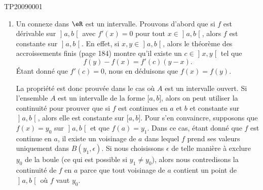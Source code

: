 
\begin{corrige}{TP20090001}

	\begin{enumerate}

		\item
			Un connexe dans $\eR$ est un intervalle. Prouvons d'abord que si $f$ est dérivable sur $\mathopen] a , b \mathclose[$ avec $f'(x)=0$ pour tout $x\in \mathopen] a , b \mathclose[$, alors $f$ est constante sur $\mathopen] a , b \mathclose[$. En effet, si $x,y\in\mathopen] a , b \mathclose[$, alors le théorème des accroissements finis (page 184) montre qu'il existe un $c\in\mathopen] x , y \mathclose[$ tel que
			\begin{equation}
				f(y)-f(x)=f'(c)(y-x).
			\end{equation}
			Étant donné que $f'(c)=0$, nous en déduisons que $f(x)=f(y)$.

			La propriété est donc prouvée dans le cas où $A$ est un intervalle ouvert. Si l'ensemble $A$ est un intervalle de la forme $\mathopen[ a , b \mathclose]$, alors on peut utiliser la continuité pour prouver que si $f$ est continues en $a$ et $b$ et constante sur $\mathopen] a , b \mathclose[$, alors elle est constante sur $\mathopen[ a , b \mathclose]$. Pour s'en convaincre, supposons que $f(x)=y_0$ sur $\mathopen] a , b \mathclose[$ et que $f(a)=y_1$. Dans ce cas, étant donné que $f$ est continue en $a$, il existe un voisinage de $a$ dans lequel $f$ prend ses valeurs uniquement dans $B(y_1,\epsilon)$. Si nous choisissons $\epsilon$ de telle manière à exclure $y_0$ de la boule (ce qui est possible si $y_1\neq y_0$), alors nous contredisons la continuité de $f$ en $a$ parce que tout voisinage de $a$ contient un point de $\mathopen] a , b \mathclose[$ où $f$ vaut $y_0$.


\end{enumerate}
\end{corrige}
